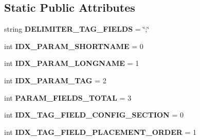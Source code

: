 \subsection*{Static Public Attributes}
\begin{DoxyCompactItemize}
\item 
string {\bfseries D\+E\+L\+I\+M\+I\+T\+E\+R\+\_\+\+T\+A\+G\+\_\+\+F\+I\+E\+L\+DS} = \char`\"{};\char`\"{}\hypertarget{classnegui_1_1pgparamset_1_1PGParamSet_a40e875db5bb216d88fee5fbce8bf229c}{}\label{classnegui_1_1pgparamset_1_1PGParamSet_a40e875db5bb216d88fee5fbce8bf229c}

\item 
int {\bfseries I\+D\+X\+\_\+\+P\+A\+R\+A\+M\+\_\+\+S\+H\+O\+R\+T\+N\+A\+ME} = 0\hypertarget{classnegui_1_1pgparamset_1_1PGParamSet_a5f0fb3e2685ab478b2cc610ddb3cb4ae}{}\label{classnegui_1_1pgparamset_1_1PGParamSet_a5f0fb3e2685ab478b2cc610ddb3cb4ae}

\item 
int {\bfseries I\+D\+X\+\_\+\+P\+A\+R\+A\+M\+\_\+\+L\+O\+N\+G\+N\+A\+ME} = 1\hypertarget{classnegui_1_1pgparamset_1_1PGParamSet_a8e37b1a7f09f15b5a3977250aa315ff9}{}\label{classnegui_1_1pgparamset_1_1PGParamSet_a8e37b1a7f09f15b5a3977250aa315ff9}

\item 
int {\bfseries I\+D\+X\+\_\+\+P\+A\+R\+A\+M\+\_\+\+T\+AG} = 2\hypertarget{classnegui_1_1pgparamset_1_1PGParamSet_aafe4650bfa58bd9751cdaa173b910c75}{}\label{classnegui_1_1pgparamset_1_1PGParamSet_aafe4650bfa58bd9751cdaa173b910c75}

\item 
int {\bfseries P\+A\+R\+A\+M\+\_\+\+F\+I\+E\+L\+D\+S\+\_\+\+T\+O\+T\+AL} = 3\hypertarget{classnegui_1_1pgparamset_1_1PGParamSet_aeaf803935c95ef6865aa8bc827290cde}{}\label{classnegui_1_1pgparamset_1_1PGParamSet_aeaf803935c95ef6865aa8bc827290cde}

\item 
int {\bfseries I\+D\+X\+\_\+\+T\+A\+G\+\_\+\+F\+I\+E\+L\+D\+\_\+\+C\+O\+N\+F\+I\+G\+\_\+\+S\+E\+C\+T\+I\+ON} = 0\hypertarget{classnegui_1_1pgparamset_1_1PGParamSet_ac9ea8e939528fa5975acdfd6c0184d7b}{}\label{classnegui_1_1pgparamset_1_1PGParamSet_ac9ea8e939528fa5975acdfd6c0184d7b}

\item 
int {\bfseries I\+D\+X\+\_\+\+T\+A\+G\+\_\+\+F\+I\+E\+L\+D\+\_\+\+P\+L\+A\+C\+E\+M\+E\+N\+T\+\_\+\+O\+R\+D\+ER} = 1\hypertarget{classnegui_1_1pgparamset_1_1PGParamSet_a49b14f1ea25d59582e40c8bf638ce0e9}{}\label{classnegui_1_1pgparamset_1_1PGParamSet_a49b14f1ea25d59582e40c8bf638ce0e9}


\end{DoxyCompactItemize}
